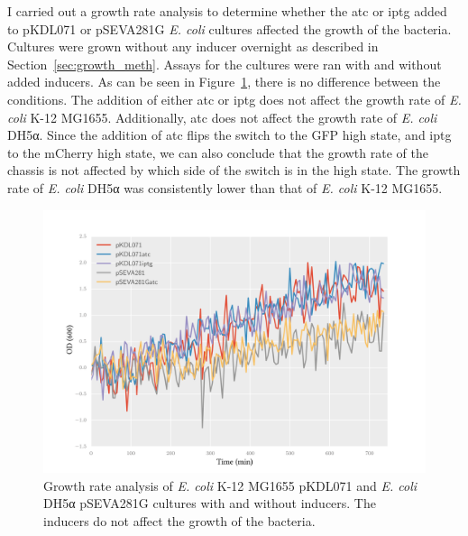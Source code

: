 I carried out a growth rate analysis to determine whether the \acrshort{atc} or \acrshort{iptg} added to pKDL071 or pSEVA281G \textit{E. coli} cultures affected the growth of the bacteria. Cultures were grown without any inducer overnight as described in Section~\ref{sec:growth_meth}. Assays for the cultures were ran with and without added inducers. As can be seen in Figure~\ref{fig:growth_curve}, there is no difference between the conditions. The addition of either \acrshort{atc} or \acrshort{iptg} does not affect the growth rate of \textit{E. coli} K-12 MG1655. Additionally, \acrshort{atc} does not affect the growth rate of \textit{E. coli} DH5α. Since the addition of \acrshort{atc} flips the switch to the GFP high state, and \acrshort{iptg} to the mCherry high state, we can also conclude that the growth rate of the chassis is not affected by which side of the switch is in the high state. The growth rate of \textit{E. coli} DH5α was consistently lower than that of \textit{E. coli} K-12 MG1655.

\begin{figure}[htbp]
	\begin{center}
		\includegraphics[scale=0.6]{../../chapters/chapterABCFlow/images/growth_curves.png}
		\caption[Growth rate curves of cultures with and without inducers]{\label{fig:growth_curve} Growth rate analysis of \textit{E. coli} K-12 MG1655 pKDL071 and \textit{E. coli} DH5α pSEVA281G cultures with and without inducers. The inducers do not affect the growth of the bacteria. }
	\end{center}
\end{figure}

\clearpage



